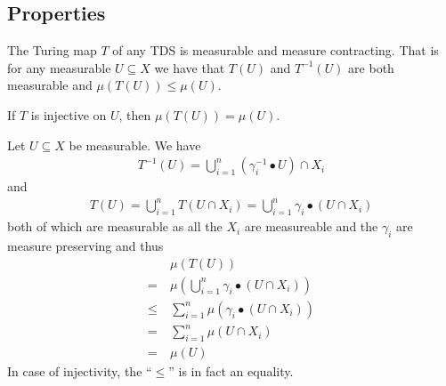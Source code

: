 \subsection{Properties}

\begin{Lemma} \label{tds:lemma_tx_measurable:lemma}
	The Turing map $T$ of any TDS is measurable and measure contracting. That is for any measurable $U \subseteq X$ we have that $T(U)$ and $T^{-1}(U)$ are both measurable and $\mu(T(U)) \leq \mu(U)$.

	If $T$ is injective on $U$, then $\mu(T(U)) = \mu(U)$.
\end{Lemma}
\proof
Let $U \subseteq X$ be measurable. We have
\begin{align*}
	T^{-1}(U) = \bigcup_{i=1}^n (\gamma_i^{-1} \bullet U) \cap X_i
\end{align*}
and
\begin{align*}
	T(U) = \bigcup_{i=1}^n T(U \cap X_i) = \bigcup_{i=1}^n \gamma_i \bullet (U \cap X_i)
\end{align*}
both of which are measurable as all the $X_i$ are measureable and the $\gamma_i$ are measure preserving and thus
\begin{align*}
	  &\mu(T(U)) \\
	=~&\mu(\bigcup_{i=1}^n \gamma_i \bullet (U \cap X_i)) \\
	\leq~&\sum_{i=1}^n \mu(\gamma_i \bullet (U \cap X_i)) \\
	=~&\sum_{i=1}^n \mu(U \cap X_i) \\
	=~&\mu(U)
\end{align*}
In case of injectivity, the ``$\leq$'' is in fact an equality.
\endproof
